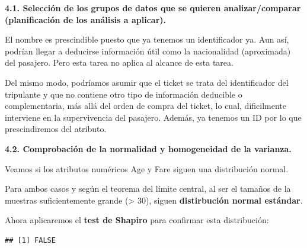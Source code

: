 \documentclass[]{article}
\newenvironment{Shaded}{\begin{snugshade}}{\end{snugshade}}
\newcommand{\FloatTok}[1]{\textcolor[rgb]{0.00,0.00,0.81}{#1}}
\newcommand{\KeywordTok}[1]{\textcolor[rgb]{0.13,0.29,0.53}{\textbf{#1}}}
\newcommand{\NormalTok}[1]{#1}
\newcommand{\OperatorTok}[1]{\textcolor[rgb]{0.81,0.36,0.00}{\textbf{#1}}}
\newcommand{\OtherTok}[1]{\textcolor[rgb]{0.56,0.35,0.01}{#1}}
\newcommand{\StringTok}[1]{\textcolor[rgb]{0.31,0.60,0.02}{#1}}
\begin{document}
\textbf{4.1. Selección de los grupos de datos que se quieren
analizar/comparar (planificación de los análisis a aplicar).}

El nombre es prescindible puesto que ya tenemos un identificador ya. Aun
así, podrían llegar a deducirse información útil como la nacionalidad
(aproximada) del pasajero. Pero esta tarea no aplica al alcance de esta
tarea.

\begin{Shaded}
\end{Shaded}

Del mismo modo, podríamos asumir que el ticket se trata del
identificador del tripulante y que no contiene otro tipo de información
deducible o complementaria, más allá del orden de compra del ticket, lo
cual, dificilmente interviene en la supervivencia del pasajero. Además,
ya tenemos un ID por lo que prescindiremos del atributo.

\begin{Shaded}
\end{Shaded}

\textbf{4.2. Comprobación de la normalidad y homogeneidad de la
varianza.}

Veamos si los atributos numéricos Age y Fare siguen una distribución
normal.

Para ambos casos y según el teorema del límite central, al ser el
tamaños de la muestras suficientemente grande (\textgreater{} 30),
siguen \textbf{distirbución normal estándar}.

Ahora aplicaremos el \textbf{test de Shapiro} para confirmar esta
distribución:

\begin{Shaded}
\end{Shaded}

\begin{verbatim}
## [1] FALSE
\end{verbatim}
\end{document}
